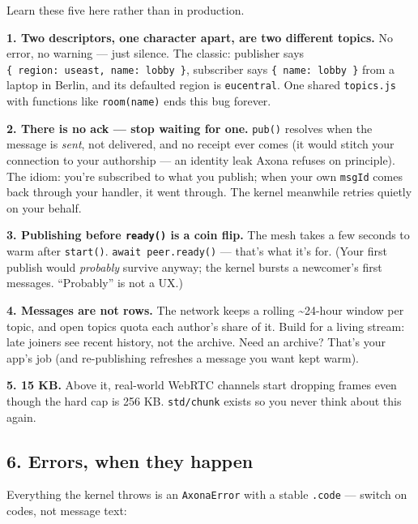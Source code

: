\documentclass[
  nobib]{tufte-handout}
\begin{document}
Learn these five here rather than in production.

\textbf{1. Two descriptors, one character apart, are two different
topics.} No error, no warning --- just silence. The classic: publisher
says
\texttt{\{\ region:\ \textquotesingle{}useast\textquotesingle{},\ name:\ \textquotesingle{}lobby\textquotesingle{}\ \}},
subscriber says
\texttt{\{\ name:\ \textquotesingle{}lobby\textquotesingle{}\ \}} from a
laptop in Berlin, and its defaulted region is \texttt{eucentral}. One
shared \texttt{topics.js} with functions like \texttt{room(name)} ends
this bug forever.

\textbf{2. There is no ack --- stop waiting for one.} \texttt{pub()}
resolves when the message is \emph{sent}, not delivered, and no receipt
ever comes (it would stitch your connection to your authorship --- an
identity leak Axona refuses on principle). The idiom: you're subscribed
to what you publish; when your own \texttt{msgId} comes back through
your handler, it went through. The kernel meanwhile retries quietly on
your behalf.

\textbf{3. Publishing before \texttt{ready()} is a coin flip.} The mesh
takes a few seconds to warm after \texttt{start()}.
\texttt{await\ peer.ready()} --- that's what it's for. (Your first
publish would \emph{probably} survive anyway; the kernel bursts a
newcomer's first messages. ``Probably'' is not a UX.)

\textbf{4. Messages are not rows.} The network keeps a rolling
\textasciitilde24-hour window per topic, and open topics quota each
author's share of it. Build for a living stream: late joiners see recent
history, not the archive. Need an archive? That's your app's job (and
re-publishing refreshes a message you want kept warm).

\textbf{5. 15 KB.} Above it, real-world WebRTC channels start dropping
frames even though the hard cap is 256 KB. \texttt{std/chunk} exists so
you never think about this again.

\subsection{6. Errors, when they happen}\label{errors-when-they-happen}

Everything the kernel throws is an \texttt{AxonaError} with a stable
\texttt{.code} --- switch on codes, not message text:
\end{document}
